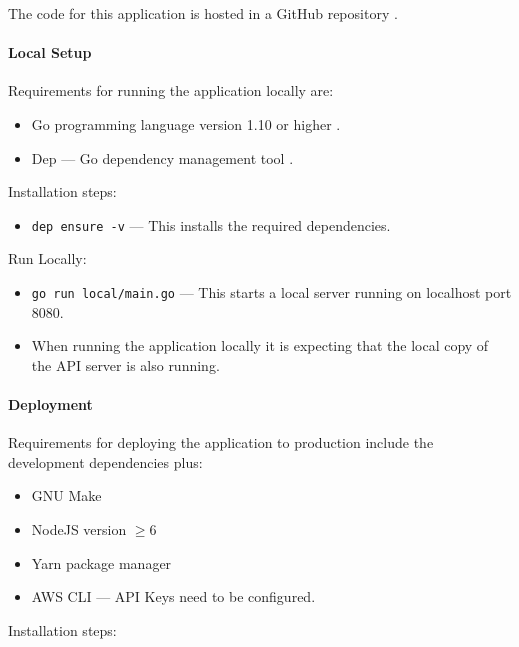 \documentclass[a4paper,11pt]{article}
\def\code#1{\texttt{#1}}
\begin{document}
The code for this application is hosted in a GitHub repository
\autocite{github:14}.

\paragraph{Local Setup}

Requirements for running the application locally are:

\begin{itemize}
  \item Go programming language version 1.10 or higher \autocite{go:8}.
  \item Dep --- Go dependency management tool \autocite{dep:12}.
\end{itemize}

\noindent{}
Installation steps:

\begin{itemize}
  \item \code{dep ensure -v} --- This installs the required dependencies.
\end{itemize}

\noindent{}
Run Locally:

\begin{itemize}
  \item \code{go run local/main.go} --- This starts a local server running on
    localhost port 8080.
  \item When running the application locally it is expecting that the local copy
    of the API server is also running.
\end{itemize}

\paragraph{Deployment}

Requirements for deploying the application to production include the development
dependencies plus:

\begin{itemize}
  \item GNU Make \autocite{gnu:15}
  \item NodeJS version $\geq 6$ \autocite{node:16}
  \item Yarn package manager \autocite{yarn:17}
  \item AWS CLI \autocite{aws:18} --- API Keys need to be configured.
\end{itemize}

\noindent{}
Installation steps:
\end{document}
